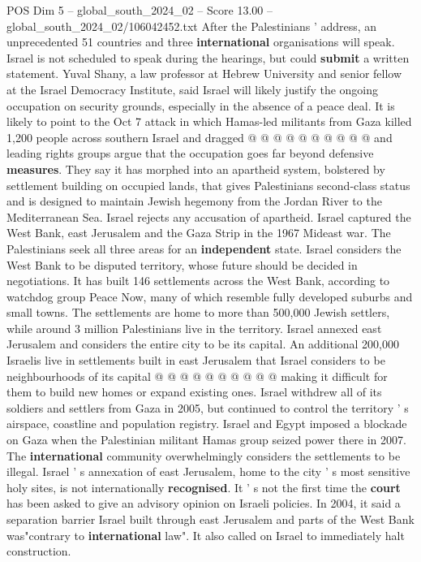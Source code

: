 \begin{textsample}{POS Dim 5 – global\_south\_2024\_02 – Score 13.00 – global\_south\_2024\_02/106042452.txt}
After the Palestinians ' address, an unprecedented 51 countries and three \textbf{international} organisations will speak.
Israel is not scheduled to speak during the hearings, but could \textbf{submit} a written statement.
Yuval Shany, a law professor at Hebrew University and senior fellow at the Israel Democracy Institute, said Israel will likely justify the ongoing occupation on security grounds, especially in the absence of a peace deal.
It is likely to point to the Oct 7 attack in which Hamas-led militants from Gaza killed 1,200 people across southern Israel and dragged @ @ @ @ @ @ @ @ @ @ and leading rights groups argue that the occupation goes far beyond defensive \textbf{measures}.
They say it has morphed into an apartheid system, bolstered by settlement building on occupied lands, that gives Palestinians second-class status and is designed to maintain Jewish hegemony from the Jordan River to the Mediterranean Sea.
Israel rejects any accusation of apartheid.
Israel captured the West Bank, east Jerusalem and the Gaza Strip in the 1967 Mideast war.
The Palestinians seek all three areas for an \textbf{independent} state.
Israel considers the West Bank to be disputed territory, whose future should be decided in negotiations.
It has built 146 settlements across the West Bank, according to watchdog group Peace Now, many of which resemble fully developed suburbs and small towns.
The settlements are home to more than 500,000 Jewish settlers, while around 3 million Palestinians live in the territory.
Israel annexed east Jerusalem and considers the entire city to be its capital.
An additional 200,000 Israelis live in settlements built in east Jerusalem that Israel considers to be neighbourhoods of its capital @ @ @ @ @ @ @ @ @ @ making it difficult for them to build new homes or expand existing ones.
Israel withdrew all of its soldiers and settlers from Gaza in 2005, but continued to control the territory ' s airspace, coastline and population registry.
Israel and Egypt imposed a blockade on Gaza when the Palestinian militant Hamas group seized power there in 2007.
The \textbf{international} community overwhelmingly considers the settlements to be illegal.
Israel ' s annexation of east Jerusalem, home to the city ' s most sensitive holy sites, is not internationally \textbf{recognised}.
It ' s not the first time the \textbf{court} has been asked to give an advisory opinion on Israeli policies.
In 2004, it said a separation barrier Israel built through east Jerusalem and parts of the West Bank was"contrary to \textbf{international} law".
It also called on Israel to immediately halt construction.

\end{textsample}
